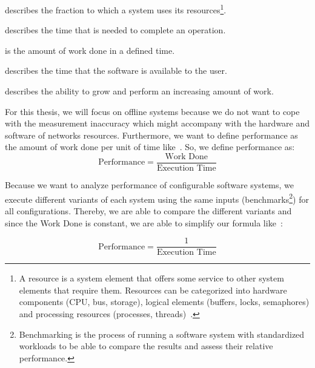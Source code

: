 \begin{description}[style=multiline,leftmargin=10em]
	\item [Resource Utilization] describes the fraction to which a system uses its resources\footnote{A resource is a system element that offers some service to other system elements that require them. Resources can be categorized into hardware components (CPU, bus, storage), logical elements (buffers, locks, semaphores) and processing resources (processes, threads)~\cite{woodside2007future}.}.
	\item [Response Time] describes the time that is needed to complete an operation.
	\item [Throughput] is the amount of work done in a defined time.
	\item [Availability] describes the time that the software is available to the user.
	\item [Scalability] describes the ability to grow and perform an increasing amount of work. 
\end{description}

For this thesis, we will focus on offline systems because we do not want to cope with the measurement inaccuracy which might accompany with the hardware and software of networks resources. 
Furthermore, we want to define performance as the amount of work done per unit of time like~\cite{tsirogiannis2010analyzing}. 
So, we define performance as:
\begin{equation}
	\label{def:perf1}
	\mbox{Performance}=\frac{\mbox{Work Done}}{\mbox{Execution Time}}
\end{equation}

Because we want to analyze performance of configurable software systems, we execute different variants of each system using the same inputs (benchmarks\footnote{Benchmarking is the process of running a software system with standardized workloads to be able to compare the results and assess their relative performance.}) for all configurations. 
Thereby, we are able to compare the different variants and since the \textsf{Work Done} is constant, we are able to simplify our formula like~\cite{siegmund2015performance}:

\begin{equation}
	\label{def:perf2}
	\mbox{Performance}=\frac{\mbox{1}}{\mbox{Execution Time}}
\end{equation}


